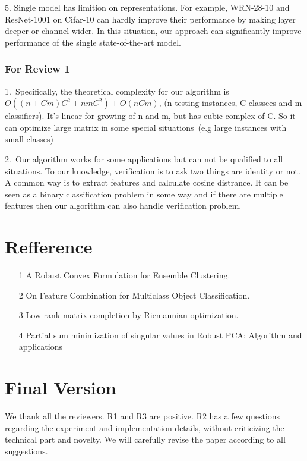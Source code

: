 \documentclass[letterpaper]{article}
\begin{document}
5. Single model has limition on representations.
For example, WRN-28-10 and ResNet-1001 on Cifar-10 can hardly improve their performance by making layer deeper or channel wider.
In this situation, our approach can significantly improve performance of the single state-of-the-art model.

\subsubsection{For Review 1}

1.~Specifically, the theoretical complexity for our algorithm is $O((n+Cm)C^2 + nmC^2) + O(nCm)$, (n testing instances, C classees and m classifiers).
It's linear for growing of n and m, but has cubic complex of C.
So it can optimize large matrix in some special situations~(e.g large instances with small classes) 

2.~Our algorithm works for some applications but can not be qualified to all situations.
To our knowledge, verification is to ask two things are identity or not. A common way is to extract features and calculate cosine distrance.
It can be seen as a binary classification problem in some way and if there are multiple features then our algorithm can also handle verification problem.

\section{Refference}
\begin{itemize}
  \item [1] A Robust Convex Formulation for Ensemble Clustering.
  \item [2] On Feature Combination for Multiclass Object Classification.
  \item [3] Low-rank matrix completion by Riemannian optimization.
  \item [4] Partial sum minimization of singular values in Robust PCA: Algorithm and applications
\end{itemize}

\fi

\section{Final Version}

We thank all the reviewers. R1 and R3 are positive. R2 has a few questions regarding the experiment and implementation details, without criticizing the technical part and novelty. We will carefully revise the paper according to all suggestions. 
\end{document}
